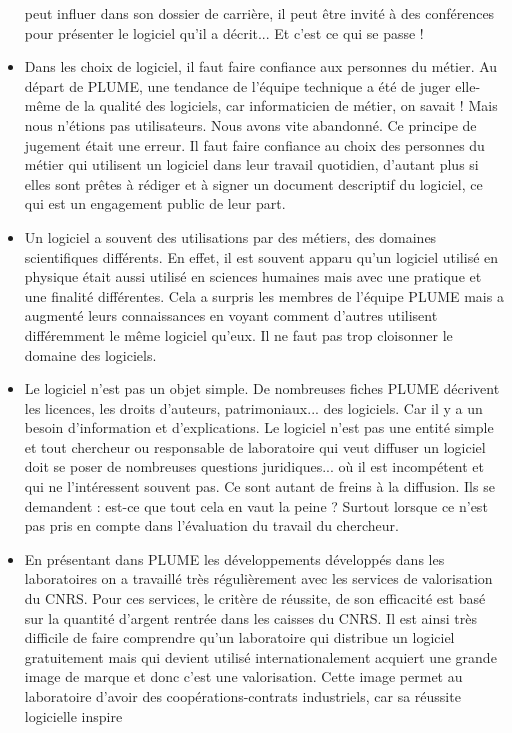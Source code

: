 \documentclass{FramateX}
\begin{document}
\begin{refsection}
\begin{itemize}
peut influer dans son dossier de carrière, il peut être invité à des
conférences pour présenter le logiciel qu'il a décrit... Et c'est ce
qui se passe ! 
\item Dans les choix de logiciel, il faut faire confiance aux personnes
du métier. Au départ de PLUME, une tendance de l'équipe technique a été
de juger elle-même de la qualité des logiciels, car informaticien de
métier, on savait ! Mais nous n'étions pas utilisateurs. Nous avons
vite abandonné. Ce principe de jugement était une erreur. Il faut faire
confiance au choix des personnes du métier qui utilisent un logiciel
dans leur travail quotidien, d'autant plus si elles sont prêtes à
rédiger et à signer un document descriptif du logiciel, ce qui est un
engagement public de leur part.
\item Un logiciel a souvent des utilisations par des métiers, des
domaines scientifiques différents. En effet, il est souvent apparu
qu'un logiciel utilisé en physique était aussi utilisé en sciences
humaines mais avec une pratique et une finalité différentes. Cela a
surpris les membres de l'équipe PLUME mais a augmenté leurs
connaissances en voyant comment d'autres utilisent différemment le même
logiciel qu'eux. Il ne faut pas trop cloisonner le domaine des
logiciels.
\item Le logiciel n'est pas un objet simple. De nombreuses fiches PLUME
décrivent les licences, les droits d'auteurs, patrimoniaux... des
logiciels. Car il y a un besoin d'information et d'explications. Le
logiciel n'est pas une entité simple et tout chercheur ou responsable
de laboratoire qui veut diffuser un logiciel doit se poser de
nombreuses questions juridiques... où il est incompétent et qui ne
l'intéressent souvent pas. Ce sont autant de freins à la diffusion. Ils
se demandent : est-ce que tout cela en vaut la peine ? Surtout lorsque
ce n'est pas pris en compte dans l'évaluation du travail du chercheur.
\item En présentant dans PLUME les développements développés dans les
laboratoires on a travaillé très régulièrement avec les services de
valorisation du CNRS. Pour ces services, le critère de réussite, de son
efficacité est basé sur la quantité d'argent rentrée dans les caisses
du CNRS. Il est ainsi très difficile de faire comprendre qu'un
laboratoire qui distribue un logiciel gratuitement mais qui devient
utilisé internationalement acquiert une grande image de marque et donc
c'est une valorisation. Cette image permet au laboratoire d'avoir des
coopérations-contrats industriels, car sa réussite logicielle inspire

\end{itemize}
\end{refsection}
\end{document}
